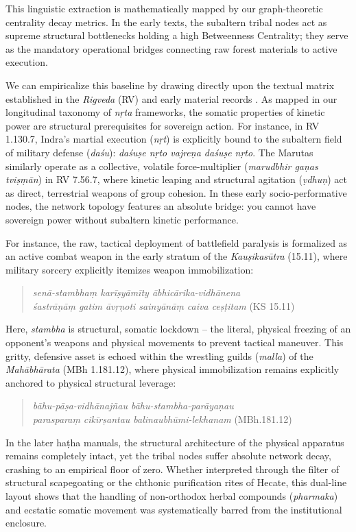 \documentclass[11pt,twoside,letterpaper]{article}
\begin{document}
This linguistic extraction is mathematically mapped by our graph-theoretic centrality decay metrics. In the early texts, the subaltern tribal nodes act as supreme structural bottlenecks holding a high Betweenness Centrality; they serve as the mandatory operational bridges connecting raw forest materials to active execution. 

We can empiricalize this baseline by drawing directly upon the textual matrix established in the \textit{Rigveda} (RV) and early material records \citep{McCartney2026}. As mapped in our longitudinal taxonomy of \textit{nṛta} frameworks, the somatic properties of kinetic power are structural prerequisites for sovereign action. For instance, in RV 1.130.7, Indra's martial execution (\textit{nṛt}) is explicitly bound to the subaltern field of military defense (\textit{daśu}): \textit{daśuṣe nṛto vajreṇa daśuṣe nṛto}. The Marutas similarly operate as a collective, volatile force-multiplier (\textit{marudbhir gaṇas tviṣṃān}) in RV 7.56.7, where kinetic leaping and structural agitation (\textit{ṿdhuṇ}) act as direct, terrestrial weapons of group cohesion. In these early socio-performative nodes, the network topology features an absolute bridge: you cannot have sovereign power without subaltern kinetic performance.

For instance, the raw, tactical deployment of battlefield paralysis is formalized as an active combat weapon in the early stratum of the \textit{Kauṣikasūtra} (15.11), where military sorcery explicitly itemizes weapon immobilization:
\begin{quote}
\small
\noindent\textit{senā-stambhaṃ karīṣyāmīty ābhicārika-vidhānena} \\
\noindent\textit{śastrāṇāṃ gatim āvṛṇoti sainyānāṃ caiva ceṣṭitam} (KS 15.11)
\end{quote}
Here, \textit{stambha} is structural, somatic lockdown -- the literal, physical freezing of an opponent's weapons and physical movements to prevent tactical maneuver. This gritty, defensive asset is echoed within the wrestling guilds (\textit{malla}) of the \textit{Mahābhārata} (MBh 1.181.12), where physical immobilization remains explicitly anchored to physical structural leverage:
\begin{quote}
\small
\noindent\textit{bāhu-pāṣa-vidhānajñau bāhu-stambha-parāyaṇau } \\
\noindent\textit{parasparaṃ cikīrṣantau balinaubhūmi-lekhanam} (MBh.181.12)
\end{quote}

In the later haṭha manuals, the structural architecture of the physical apparatus remains completely intact, yet the tribal nodes suffer absolute network decay, crashing to an empirical floor of zero. Whether interpreted through the filter of structural scapegoating \citep{Strelan2003} or the chthonic purification rites of Hecate, this dual-line layout shows that the handling of non-orthodox herbal compounds (\textit{pharmaka}) and ecstatic somatic movement was systematically barred from the institutional enclosure. 
\end{document}
